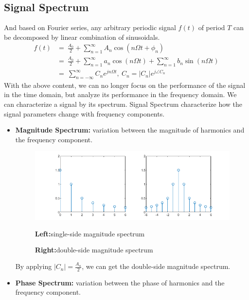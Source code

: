 \documentclass[margin,line]{res}
\begin{document}
\begin{resume}
\subsection{\textbf{Signal Spectrum}}
And based on Fourier series, any arbitrary periodic signal $f(t)$ of period $T$ can be decomposed by linear combination of sinusoidals.
\begin{align}
f(t)	&= \ \frac{A_0}{2} + \sum\limits_{n=1}^{\infty}{A_n \cos (n \Omega t + \phi_{n})} \nonumber \\
		&= \ \frac{A_0}{2} + \sum\limits_{n=1}^{\infty}{a_n \cos (n \Omega t)} + \sum\limits_{n=1}^{\infty}{b_n \sin (n \Omega t)} \nonumber \\ 
		&= \ \sum\limits_{n=-\infty}^{\infty}{C_n e^{jn\Omega t} } , \ C_n=\left|C_n\right| e^{j\angle C_n} \nonumber
\end{align}
With the above content, we can no longer focus on the performance of the signal in the time domain, but analyze its performance in the frequency domain. We can characterize a signal by its spectrum. Signal Spectrum characterize how the signal parameters change with frequency components.\par 
\begin{itemize}
	\item \textbf{Magnitude Spectrum:} variation between the magnitude of harmonics and the frequency component.\par 
	\begin{figure}[H]
		\centerline{\includegraphics[width=0.9\linewidth]{figure/fig_10.png}}
		\centerline{\textbf{Left:}single-side magnitude spectrum}
		\centerline{\textbf{Right:}double-side magnitude spectrum}
	\end{figure}
	By applying $\left|C_n\right|=\frac{A_n}{2}$, we can get the double-side magnitude spectrum.\par
	\item \textbf{Phase Spectrum:} variation between the phase of harmonics and the frequency component.\par 
	\begin{figure}[H]

\end{figure}
\end{itemize}
\end{resume}
\end{document}
